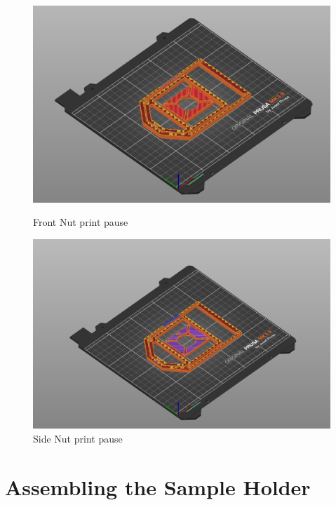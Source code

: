 \documentclass[runningheads]{llncs}
\begin{document}
\begin{figure}[h]
    \centering
    \begin{minipage}[b]{0.45\textwidth}
        \centering
        \includegraphics[width=\textwidth]{images/front_nut_3d_print_render.png} %
        \caption{Front Nut print pause}
    \end{minipage}
    \hfill
    \begin{minipage}[b]{0.47\textwidth}
        \centering
        \includegraphics[width=\textwidth]{images/side_nut_3d_print_render.png} 
        \caption{Side Nut print pause}
    \end{minipage}
\end{figure}

\section*{Assembling the Sample Holder}
\end{document}
